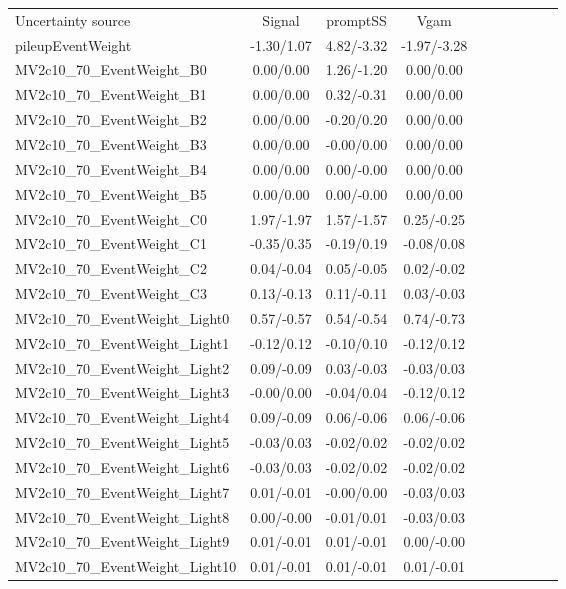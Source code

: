\begin{table}[h]
\scriptsize
\begin{center}
\begin{tabular}{l|ccccccccc}
\hline
\hline
Uncertainty source &Signal &promptSS &Vgam \\
pileupEventWeight &-1.30/1.07 &4.82/-3.32 &-1.97/-3.28 \\
MV2c10\_70\_EventWeight\_B0 &0.00/0.00 &1.26/-1.20 &0.00/0.00 \\
MV2c10\_70\_EventWeight\_B1 &0.00/0.00 &0.32/-0.31 &0.00/0.00 \\
MV2c10\_70\_EventWeight\_B2 &0.00/0.00 &-0.20/0.20 &0.00/0.00 \\
MV2c10\_70\_EventWeight\_B3 &0.00/0.00 &-0.00/0.00 &0.00/0.00 \\
MV2c10\_70\_EventWeight\_B4 &0.00/0.00 &0.00/-0.00 &0.00/0.00 \\
MV2c10\_70\_EventWeight\_B5 &0.00/0.00 &0.00/-0.00 &0.00/0.00 \\
MV2c10\_70\_EventWeight\_C0 &1.97/-1.97 &1.57/-1.57 &0.25/-0.25 \\
MV2c10\_70\_EventWeight\_C1 &-0.35/0.35 &-0.19/0.19 &-0.08/0.08 \\
MV2c10\_70\_EventWeight\_C2 &0.04/-0.04 &0.05/-0.05 &0.02/-0.02 \\
MV2c10\_70\_EventWeight\_C3 &0.13/-0.13 &0.11/-0.11 &0.03/-0.03 \\
MV2c10\_70\_EventWeight\_Light0 &0.57/-0.57 &0.54/-0.54 &0.74/-0.73 \\
MV2c10\_70\_EventWeight\_Light1 &-0.12/0.12 &-0.10/0.10 &-0.12/0.12 \\
MV2c10\_70\_EventWeight\_Light2 &0.09/-0.09 &0.03/-0.03 &-0.03/0.03 \\
MV2c10\_70\_EventWeight\_Light3 &-0.00/0.00 &-0.04/0.04 &-0.12/0.12 \\
MV2c10\_70\_EventWeight\_Light4 &0.09/-0.09 &0.06/-0.06 &0.06/-0.06 \\
MV2c10\_70\_EventWeight\_Light5 &-0.03/0.03 &-0.02/0.02 &-0.02/0.02 \\
MV2c10\_70\_EventWeight\_Light6 &-0.03/0.03 &-0.02/0.02 &-0.02/0.02 \\
MV2c10\_70\_EventWeight\_Light7 &0.01/-0.01 &-0.00/0.00 &-0.03/0.03 \\
MV2c10\_70\_EventWeight\_Light8 &0.00/-0.00 &-0.01/0.01 &-0.03/0.03 \\
MV2c10\_70\_EventWeight\_Light9 &0.01/-0.01 &0.01/-0.01 &0.00/-0.00 \\
MV2c10\_70\_EventWeight\_Light10 &0.01/-0.01 &0.01/-0.01 &0.01/-0.01 \\

\end{tabular}
\end{center}
\end{table}
